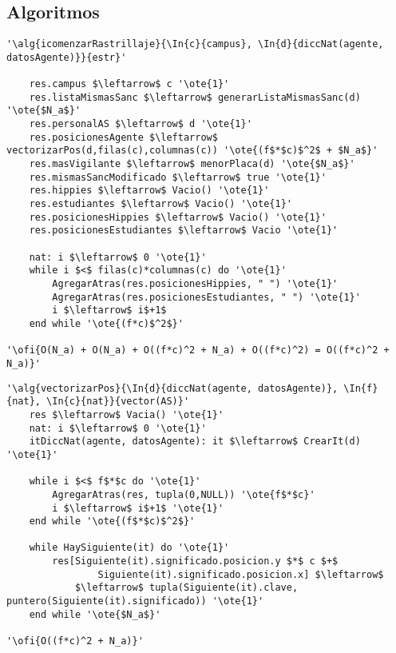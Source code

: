 \pagebreak

\subsection{Algoritmos}

\lstset{style=alg}

\begin{lstlisting}[mathescape]
'\alg{icomenzarRastrillaje}{\In{c}{campus}, \In{d}{diccNat(agente, datosAgente)}}{estr}'

	res.campus $\leftarrow$ c '\ote{1}'
	res.listaMismasSanc $\leftarrow$ generarListaMismasSanc(d) '\ote{$N_a$}'
	res.personalAS $\leftarrow$ d '\ote{1}'
	res.posicionesAgente $\leftarrow$ vectorizarPos(d,filas(c),columnas(c)) '\ote{(f$*$c)$^2$ + $N_a$}'
	res.masVigilante $\leftarrow$ menorPlaca(d) '\ote{$N_a$}'
	res.mismasSancModificado $\leftarrow$ true '\ote{1}'
	res.hippies $\leftarrow$ Vacio() '\ote{1}'
	res.estudiantes $\leftarrow$ Vacio() '\ote{1}'
	res.posicionesHippies $\leftarrow$ Vacio() '\ote{1}'
	res.posicionesEstudiantes $\leftarrow$ Vacio '\ote{1}'

	nat: i $\leftarrow$ 0 '\ote{1}'
	while i $<$ filas(c)*columnas(c) do '\ote{1}'
		AgregarAtras(res.posicionesHippies, " ") '\ote{1}'
		AgregarAtras(res.posicionesEstudiantes, " ") '\ote{1}'
		i $\leftarrow$ i$+1$
	end while '\ote{(f*c)$^2$}'

'\ofi{O(N_a) + O(N_a) + O((f*c)^2 + N_a) + O((f*c)^2) = O((f*c)^2 + N_a)}'
\end{lstlisting}

\begin{lstlisting}[mathescape]
'\alg{vectorizarPos}{\In{d}{diccNat(agente, datosAgente)}, \In{f}{nat}, \In{c}{nat}}{vector(AS)}'
	res $\leftarrow$ Vacia() '\ote{1}'
	nat: i $\leftarrow$ 0 '\ote{1}'
	itDiccNat(agente, datosAgente): it $\leftarrow$ CrearIt(d) '\ote{1}'

	while i $<$ f$*$c do '\ote{1}'
		AgregarAtras(res, tupla(0,NULL)) '\ote{f$*$c}'
		i $\leftarrow$ i$+1$ '\ote{1}'
	end while '\ote{(f$*$c)$^2$}'

	while HaySiguiente(it) do '\ote{1}'
		res[Siguiente(it).significado.posicion.y $*$ c $+$
				Siguiente(it).significado.posicion.x] $\leftarrow$
			$\leftarrow$ tupla(Siguiente(it).clave, puntero(Siguiente(it).significado)) '\ote{1}'
	end while '\ote{$N_a$}'

'\ofi{O((f*c)^2 + N_a)}'
\end{lstlisting}

